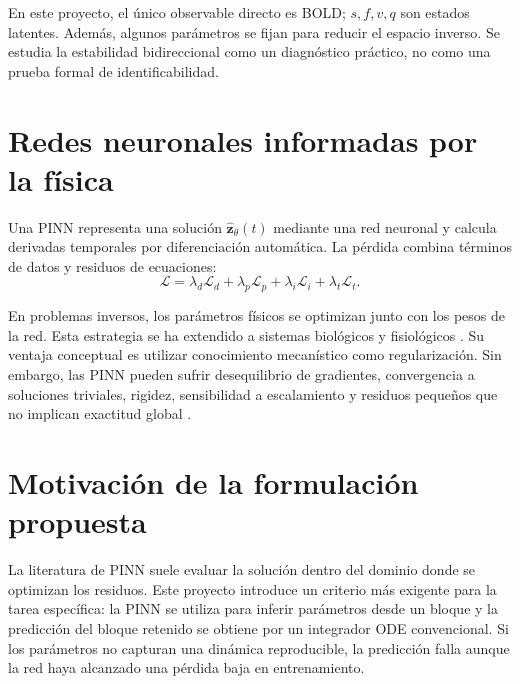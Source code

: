 En este proyecto, el único observable directo es BOLD; $s,f,v,q$ son estados latentes. Además, algunos parámetros se fijan para reducir el espacio inverso. Se estudia la estabilidad bidireccional como un diagnóstico práctico, no como una prueba formal de identificabilidad.

\section{Redes neuronales informadas por la física}
Una PINN representa una solución $\hat{\bm z}_\theta(t)$ mediante una red neuronal y calcula derivadas temporales por diferenciación automática. La pérdida combina términos de datos y residuos de ecuaciones:
\begin{equation}
\mathcal L = \lambda_d\mathcal L_d + \lambda_p\mathcal L_p + \lambda_i\mathcal L_i + \lambda_t\mathcal L_t.
\label{eq:pinnloss}
\end{equation}

En problemas inversos, los parámetros físicos se optimizan junto con los pesos de la red. Esta estrategia se ha extendido a sistemas biológicos y fisiológicos \citep{Yazdani2020,Sel2023}. Su ventaja conceptual es utilizar conocimiento mecanístico como regularización. Sin embargo, las PINN pueden sufrir desequilibrio de gradientes, convergencia a soluciones triviales, rigidez, sensibilidad a escalamiento y residuos pequeños que no implican exactitud global \citep{Wang2021,Krishnapriyan2021,Basir2022,Wang2023}.

\section{Motivación de la formulación propuesta}
La literatura de PINN suele evaluar la solución dentro del dominio donde se optimizan los residuos. Este proyecto introduce un criterio más exigente para la tarea específica: la PINN se utiliza para inferir parámetros desde un bloque y la predicción del bloque retenido se obtiene por un integrador ODE convencional. Si los parámetros no capturan una dinámica reproducible, la predicción falla aunque la red haya alcanzado una pérdida baja en entrenamiento.

